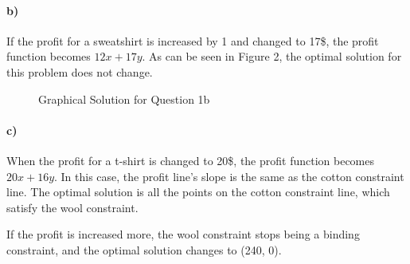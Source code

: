\documentclass{article}
\begin{document}
\paragraph*{b)}
If the profit for a sweatshirt is increased by 1 and changed to 17\$, the profit function becomes $12x + 17y$.
As can be seen in Figure 2, the optimal solution for this problem does not change.
\begin{figure}[H]
    \centering
    \caption{Graphical Solution for Question 1b}
\end{figure}

\paragraph*{c)}
When the profit for a t-shirt is changed to 20\$, the profit function becomes $20x + 16y$. In this case, the profit line's slope is the same as the cotton constraint line.
The optimal solution is all the points on the cotton constraint line, which satisfy the wool constraint.

If the profit is increased more, the wool constraint stops being a binding constraint, and the optimal solution changes to (240, 0).
\end{document}
